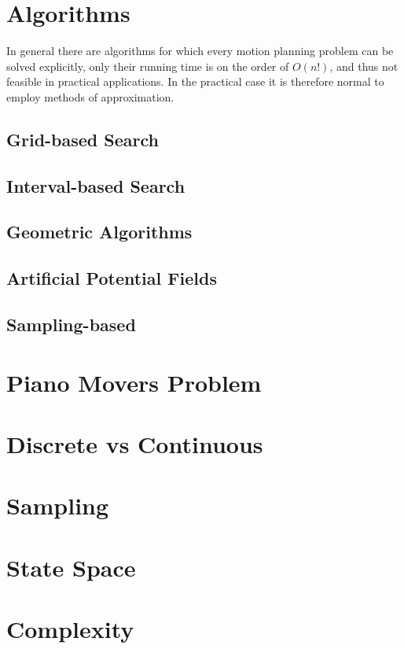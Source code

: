 \section{Algorithms}
In general there are algorithms for which every motion planning problem can be
solved explicitly, only their running time is on the order of \(O(n!)\), and
thus not feasible in practical applications. In the practical case it is
therefore normal to employ methods of approximation.

\subsection{Grid-based Search}

\subsection{Interval-based Search}

\subsection{Geometric Algorithms}

\subsection{Artificial Potential Fields}

\subsection{Sampling-based}

\section{Piano Movers Problem}

\section{Discrete vs Continuous}

\section{Sampling}

\section{State Space}

\section{Complexity}

